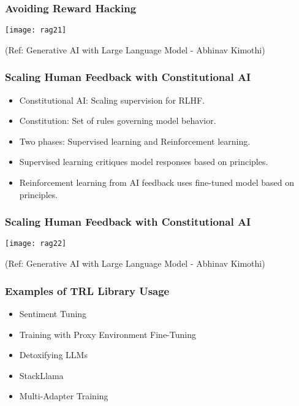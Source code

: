 \begin{frame}[fragile]\frametitle{Avoiding Reward Hacking}


		\begin{center}
		\texttt{[image: rag21]}
		\end{center}

{\tiny (Ref: Generative AI with Large Language Model - Abhinav  Kimothi)}

\end{frame}


\begin{frame}[fragile]\frametitle{Scaling Human Feedback with Constitutional AI}
\begin{itemize}
    \item Constitutional AI: Scaling supervision for RLHF.
    \item Constitution: Set of rules governing model behavior.
    \item Two phases: Supervised learning and Reinforcement learning.
    \item Supervised learning critiques model responses based on principles.
    \item Reinforcement learning from AI feedback uses fine-tuned model based on principles.
\end{itemize}
\end{frame}

\begin{frame}[fragile]\frametitle{Scaling Human Feedback with Constitutional AI}


		\begin{center}
		\texttt{[image: rag22]}
		\end{center}

{\tiny (Ref: Generative AI with Large Language Model - Abhinav  Kimothi)}

\end{frame}


\begin{frame}[fragile]\frametitle{Examples of TRL Library Usage}
\begin{itemize}
    \item Sentiment Tuning
    \item Training with Proxy Environment Fine-Tuning
    \item Detoxifying LLMs
    \item StackLlama
    \item Multi-Adapter Training
\end{itemize}
\end{frame}

